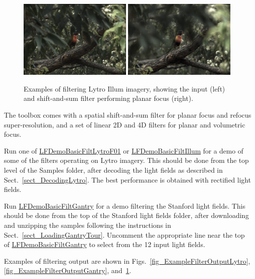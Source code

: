 \documentclass[onecolumn]{article}
\newcommand{\CiteFunction}[1]{\hyperlink{#1}{\small #1}}
\begin{document}
\begin{figure}
	\centering
	\includegraphics[width=0.49\textwidth]{Figs/LorikeetHiding_in}
	\includegraphics[width=0.49\textwidth]{Figs/LorikeetHiding_shiftsum_bird}
	\caption{Examples of filtering Lytro Illum imagery, showing the input (left) and shift-and-sum filter performing planar focus (right).}
	\label{fig_ExampleFilterOutputIllum}
\end{figure}

The toolbox comes with a spatial shift-and-sum filter for planar focus and refocus super-resolution, and a set of linear 2D and 4D filters for planar and volumetric focus.

Run one of \CiteFunction{LFDemoBasicFiltLytroF01} or \CiteFunction{LFDemoBasicFiltIllum} for a demo of some of the filters operating on Lytro imagery. This should be done from the top level of the Samples folder, after decoding the light fields as described in Sect.~\ref{sect_DecodingLytro}.  The best performance is obtained with rectified light fields.

Run \CiteFunction{LFDemoBasicFiltGantry} for a demo filtering the Stanford light fields.  This should be done from the top of the Stanford light fields folder, after downloading and unzipping the samples following the instructions in Sect.~\ref{sect_LoadingGantryTour}. Uncomment the appropriate line near the top of \CiteFunction{LFDemoBasicFiltGantry} to select from the 12 input light fields.

Examples of filtering output are shown in Figs.~\ref{fig_ExampleFilterOutputLytro}, \ref{fig_ExampleFilterOutputGantry}, and~\ref{fig_ExampleFilterOutputIllum}.
\end{document}
